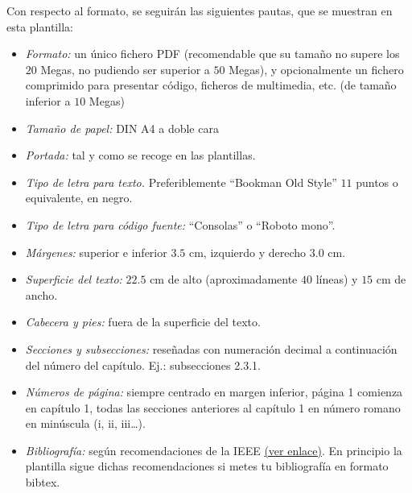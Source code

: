 Con respecto al formato, se seguirán las siguientes pautas, que se muestran en esta plantilla:
\begin{itemize}
\item \textit{Formato:} un único fichero PDF (recomendable que su tamaño no supere los $20$ Megas, no pudiendo ser superior a $50$ Megas), y opcionalmente un fichero comprimido para presentar código, ficheros de multimedia, etc. (de tamaño inferior a $10$ Megas)
\item \textit{Tamaño de papel:} DIN A4 a doble cara
\item \textit{Portada:} tal y como se recoge en las plantillas.
\item \textit{Tipo de letra para texto.} Preferiblemente ``Bookman Old Style'' $11$ puntos o equivalente, en negro.
\item \textit{Tipo de letra para código fuente:} ``Consolas'' o ``Roboto mono''.
\item \textit{Márgenes:} superior e inferior $3.5$ cm, izquierdo y derecho $3.0$ cm.
\item \textit{Superficie del texto:} $22.5$ cm de alto (aproximadamente $40$ líneas) y $15$ cm de ancho.
\item \textit{Cabecera y pies:} fuera de la superficie del texto.
\item \textit{Secciones y subsecciones:} reseñadas con numeración decimal a continuación del número del capítulo. Ej.: subsecciones 2.3.1.
\item \textit{Números de página:} siempre centrado en margen inferior, página 1 comienza en capítulo 1, todas las secciones anteriores al capítulo 1 en número romano en minúscula (i, ii, iii…).
\item \textit{Bibliografía:} según recomendaciones de la IEEE
\href{https://www.etsiinf.upm.es/docs/estudios/grado/1475_ieeecitationref.pdf}{(ver enlace)}. En principio la plantilla sigue dichas recomendaciones si metes tu bibliografía en formato bibtex.
\end{itemize}

\medskip

